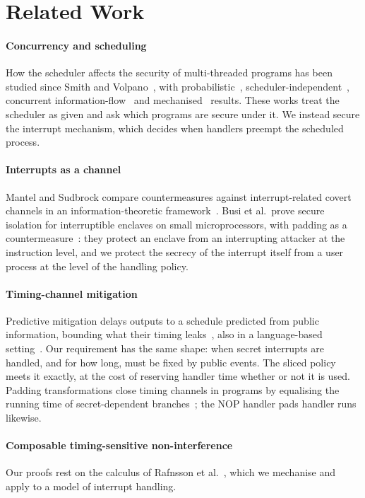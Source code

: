 \section{Related Work}\label{sec:related}

\paragraph{Concurrency and scheduling} How the scheduler affects the security of
multi-threaded programs has been studied since Smith and Volpano~\cite{smith1998},
with probabilistic~\cite{sabelfeld2000}, scheduler-independent~\cite{mantel2010},
concurrent information-flow~\cite{stefan2012} and mechanised~\cite{vassena2017}
results. These works treat the scheduler as given and ask which
programs are secure under it. We instead secure the interrupt mechanism, which
decides when handlers preempt the scheduled process.

\paragraph{Interrupts as a channel} Mantel and Sudbrock compare countermeasures
against interrupt-related covert channels in an information-theoretic
framework~\cite{mantel2007}. Busi et al.\ prove secure isolation for interruptible
enclaves on small microprocessors, with padding as a countermeasure~\cite{busi2020}:
they protect an enclave from an interrupting attacker at the instruction level, and we
protect the secrecy of the interrupt itself from a user process at the level of the
handling policy.

\paragraph{Timing-channel mitigation} Predictive mitigation delays outputs to a
schedule predicted from public information, bounding what their timing
leaks~\cite{askarov2010}, also in a language-based setting~\cite{zhang2012}. Our
requirement has the same shape: when secret interrupts are handled, and for how
long, must be fixed by public events. The sliced policy meets it exactly, at the cost of reserving
handler time whether or not it is used. Padding transformations close timing channels
in programs by equalising the running time of secret-dependent
branches~\cite{agat2000}; the NOP handler pads handler runs likewise.

\paragraph{Composable timing-sensitive non-interference} Our proofs rest on the
calculus of Rafnsson et al.~\cite{rafnsson2017}, which we mechanise and apply to a
model of interrupt handling.

